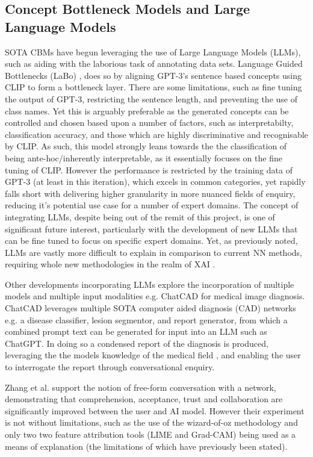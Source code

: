 \subsection{Concept Bottleneck Models and Large Language Models}

SOTA CBMs have begun leveraging the use of Large Language Models (LLMs), such as aiding with the laborious task of annotating data sets. Language Guided Bottlenecks (LaBo) \cite{yangLanguageBottleLanguage2023}, does so by aligning GPT-3's sentence based concepts using CLIP to form a bottleneck layer. There are some limitations, such as fine tuning the output of GPT-3, restricting the sentence length, and preventing the use of class names. Yet this is arguably preferable as the generated concepts can be controlled and chosen based upon a number of factors, such as interpretabilty, classification accuracy, and those which are highly discriminative and recognisable by CLIP. As such, this model strongly leans towards the the classification of being ante-hoc/inherently interpretable, as it essentially focuses on the fine tuning of CLIP. However the performance is restricted by the training data of GPT-3 (at least in this iteration), which excels in common categories, yet rapidly falls short with delivering higher granularity in more nuanced fields of enquiry, reducing it's potential use case for a number of expert domains. The concept of integrating LLMs, despite being out of the remit of this project, is one of significant future interest, particularly with the development of new LLMs that can be fine tuned to focus on specific expert domains. Yet, as previously noted, LLMs are vastly more difficult to explain in comparison to current NN methods, requiring whole new methodologies in the realm of XAI \cite{zhaoExplainabilityLargeLanguage2023}.  

Other developments incorporating LLMs explore the incorporation of multiple models and multiple input modalities e.g. ChatCAD \cite{wangChatCADInteractiveComputerAided2023} for medical image diagnosis. ChatCAD leverages multiple SOTA computer aided diagnosis (CAD) networks e.g. a disease classifier, lesion segmentor, and report generator, from which a combined prompt text can be generated for input into an LLM such as ChatGPT. In doing so a condensed report of the diagnosis is produced, leveraging the the models knowledge of the medical field \cite{gilsonHowDoesChatGPT2023}, and enabling the user to interrogate the report through conversational enquiry. 

Zhang et al. \cite{zhangMayAskFollowup2023} support the notion of free-form conversation with a network, demonstrating that comprehension, acceptance, trust and collaboration are significantly improved between the user and AI model. However their experiment is not without limitations, such as the use of the wizard-of-oz methodology and only two two feature attribution tools (LIME and Grad-CAM) being used as a means of explanation (the limitations of which have previously been stated).

